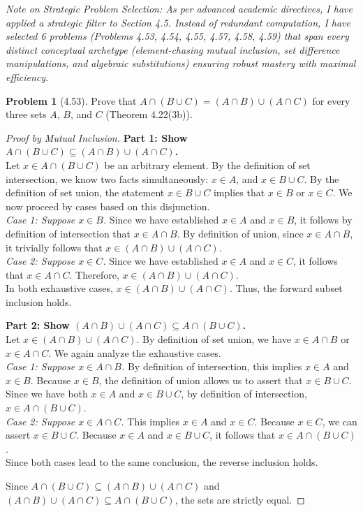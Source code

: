 \documentclass[11pt]{article}
\theoremstyle{definition}
\newtheorem{problem}{Problem}
\begin{document}
\textit{Note on Strategic Problem Selection: As per advanced academic directives, I have applied a strategic filter to Section 4.5. Instead of redundant computation, I have selected 6 problems (Problems 4.53, 4.54, 4.55, 4.57, 4.58, 4.59) that span every distinct conceptual archetype (element-chasing mutual inclusion, set difference manipulations, and algebraic substitutions) ensuring robust mastery with maximal efficiency.}

\begin{problem}[4.53]
Prove that $A \cap (B \cup C) = (A \cap B) \cup (A \cap C)$ for every three sets $A$, $B$, and $C$ (Theorem 4.22(3b)).
\end{problem}
\begin{proof}[Proof by Mutual Inclusion]
\textbf{Part 1: Show $A \cap (B \cup C) \subseteq (A \cap B) \cup (A \cap C)$.} \\
Let $x \in A \cap (B \cup C)$ be an arbitrary element. By the definition of set intersection, we know two facts simultaneously: $x \in A$, and $x \in B \cup C$.
By the definition of set union, the statement $x \in B \cup C$ implies that $x \in B$ or $x \in C$. We now proceed by cases based on this disjunction. \\
\textit{Case 1: Suppose $x \in B$.} Since we have established $x \in A$ and $x \in B$, it follows by definition of intersection that $x \in A \cap B$. By definition of union, since $x \in A \cap B$, it trivially follows that $x \in (A \cap B) \cup (A \cap C)$. \\
\textit{Case 2: Suppose $x \in C$.} Since we have established $x \in A$ and $x \in C$, it follows that $x \in A \cap C$. Therefore, $x \in (A \cap B) \cup (A \cap C)$. \\
In both exhaustive cases, $x \in (A \cap B) \cup (A \cap C)$. Thus, the forward subset inclusion holds.

\vspace{2mm}
\noindent\textbf{Part 2: Show $(A \cap B) \cup (A \cap C) \subseteq A \cap (B \cup C)$.} \\
Let $x \in (A \cap B) \cup (A \cap C)$. By definition of set union, we have $x \in A \cap B$ or $x \in A \cap C$. We again analyze the exhaustive cases. \\
\textit{Case 1: Suppose $x \in A \cap B$.} By definition of intersection, this implies $x \in A$ and $x \in B$. Because $x \in B$, the definition of union allows us to assert that $x \in B \cup C$. Since we have both $x \in A$ and $x \in B \cup C$, by definition of intersection, $x \in A \cap (B \cup C)$. \\
\textit{Case 2: Suppose $x \in A \cap C$.} This implies $x \in A$ and $x \in C$. Because $x \in C$, we can assert $x \in B \cup C$. Because $x \in A$ and $x \in B \cup C$, it follows that $x \in A \cap (B \cup C)$. \\
Since both cases lead to the same conclusion, the reverse inclusion holds.

Since $A \cap (B \cup C) \subseteq (A \cap B) \cup (A \cap C)$ and $(A \cap B) \cup (A \cap C) \subseteq A \cap (B \cup C)$, the sets are strictly equal.
\end{proof}
\end{document}
